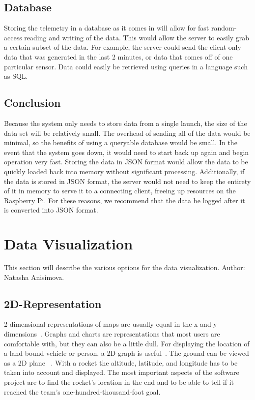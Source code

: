 \documentclass[10pt,draftclsnofoot,onecolumn]{IEEEtran}
\begin{document}
	\subsection{Database}
	Storing the telemetry in a database as it comes in will allow for fast random-access reading and writing of the data.
	This would allow the server to easily grab a certain subset of the data.
	For example, the server could send the client only data that was generated in the last 2 minutes, or data that comes off of one particular sensor.
	Data could easily be retrieved using queries in a language such as SQL.
	
	\subsection{Conclusion}
	Because the system only needs to store data from a single launch, the size of the data set will be relatively small.
	The overhead of sending all of the data would be minimal, so the benefits of using a queryable database would be small.
	In the event that the system goes down, it would need to start back up again and begin operation very fast.
	Storing the data in \ac{JSON} format would allow the data to be quickly loaded back into memory without significant processing.
	Additionally, if the data is stored in \ac{JSON} format, the server would not need to keep the entirety of it in memory to serve it to a connecting client, freeing up resources on the Raspberry Pi.
	For these reasons, we recommend that the data be logged after it is converted into \ac{JSON} format.

	\section{Data Visualization}
	This section will describe the various options for the data visualization. Author: Natasha Anisimova.
	
	\subsection{2D-Representation}
	2-dimensional representations of maps are usually equal in the x and y dimensions~\cite{2d-is-better-than-3d}. 
	Graphs and charts are representations that most users are comfortable with, but they can also be a little dull.
	For displaying the location of a land-bound vehicle or person, a 2D graph is useful~\cite{2ds-company-3ds-a-crowd}. 
	The ground can be viewed as a 2D plane ~\cite{2d-and-3d-presentation-of-spatial-data}.
	With a rocket the altitude, latitude, and longitude has to be taken into account and displayed. 
	The most important aspects of the software project are to find the rocket's location in the end and to be able to tell 
	if it reached the team's one-hundred-thousand-foot goal. 
	
\end{document}
